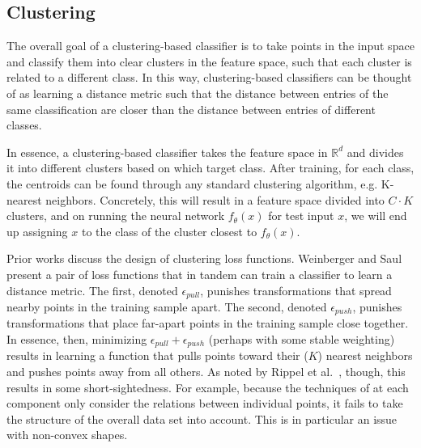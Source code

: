 \subsection{Clustering}

The overall goal of a clustering-based classifier is to take points in the input space and classify them into clear clusters in the feature space, such that each cluster is related to a different class. In this way, clustering-based classifiers can be thought of as learning a distance metric such that the distance between entries of the same classification are closer than the distance between entries of different classes.

In essence, a clustering-based classifier takes the feature space in $\mathbb{R}^d$ and divides it into different clusters based on which target class. After training, for each class, the centroids can be found through any standard clustering algorithm, e.g. K-nearest neighbors. Concretely, this will result in a feature space divided into $C\cdot K$ clusters, and on running the neural network $f_\theta(x)$ for test input $x$, we will end up assigning $x$ to the class of the cluster closest to $f_\theta(x)$. 

Prior works discuss the design of clustering loss functions. Weinberger and Saul~\cite{Weinberger2009Distance} present a pair of loss functions that in tandem can train a classifier to learn a distance metric. The first, denoted $\epsilon_{pull}$, punishes transformations that spread nearby points in the training sample apart. The second, denoted $\epsilon_{push}$, punishes transformations that place far-apart points in the training sample close together. In essence, then, minimizing $\epsilon_{pull} + \epsilon_{push}$ (perhaps with some stable weighting) results in learning a function that pulls points toward their ($K$) nearest neighbors and pushes points away from all others. As noted by Rippel et al.~\cite{Rippel2015Magnet}, though, this results in some short-sightedness. For example, because the techniques of \cite{Weinberger2009Distance} at each component only consider the relations between individual points, it fails to take the structure of the overall data set into account. This is in particular an issue with non-convex shapes. 

